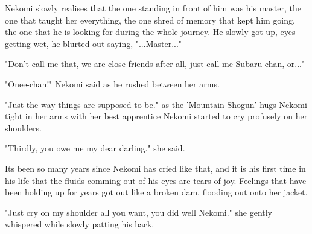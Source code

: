 Nekomi slowly realises that the one standing in front of him was his master, the one that taught her everything, the one shred of memory that kept him going, the one that he is looking for during the whole journey. He slowly got up, eyes getting wet, he blurted out saying, "...Master..."

"Don't call me that, we are close friends after all, just call me Subaru-chan, or..."

"Onee-chan!" Nekomi said as he rushed between her arms.

"Just the way things are supposed to be." as the 'Mountain Shogun' hugs Nekomi tight in her arms with her best apprentice Nekomi started to cry profusely on her shoulders.

"Thirdly, you owe me my dear darling." she said.

Its been so many years since Nekomi has cried like that, and it is his first time in his life that the fluids comming out of his eyes are tears of joy. Feelings that have been holding up for years got out like a broken dam, flooding out onto her jacket.

"Just cry on my shoulder all you want, you did well Nekomi." she gently whispered while slowly patting his back.